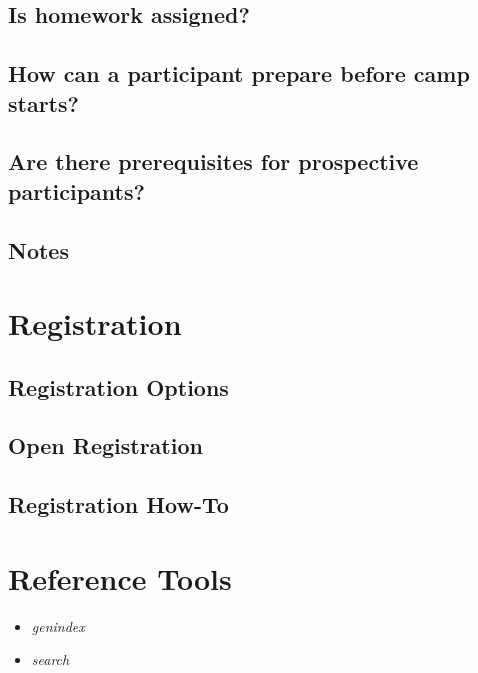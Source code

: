 \documentclass[letterpaper,10pt,english]{sphinxmanual}
\begin{document}
\section{Is homework assigned?}
\label{faq:is-homework-assigned}

\section{How can a participant prepare before camp starts?}
\label{faq:how-can-a-participant-prepare-before-camp-starts}

\section{Are there prerequisites for prospective participants?}
\label{faq:are-there-prerequisites-for-prospective-participants}

\section{Notes}
\label{faq:notes}

\chapter{Registration}
\label{registration::doc}\label{registration:index-0}\label{registration:registration}

\section{Registration Options}
\label{registration:registration-options}

\section{Open Registration}
\label{registration:open-registration}

\section{Registration How-To}
\label{registration:registration-how-to}

\chapter{Reference Tools}
\label{indepth:reference-tools}\begin{itemize}
\item {} 
\emph{genindex}

\item {} 
\emph{search}

\end{itemize}



\renewcommand{\indexname}{Index}
\printindex
\end{document}
